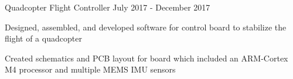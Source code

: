\begin{cventries}

  \cventry
    {Quadcopter Flight Controller} %
    {} %
    {} %
    {July 2017 - December 2017} %
    {
      \begin{cvitems} %
        \item {Designed, assembled, and developed software for control board to stabilize the flight of a quadcopter}
        \item {Created schematics and PCB layout for board which included an ARM-Cortex M4 processor and multiple MEMS IMU sensors}
      \end{cvitems}
    }


\end{cventries}
